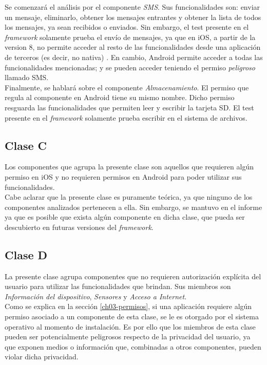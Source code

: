 Se comenzará el análisis por el componente \emph{SMS}. Sus funcionalidades son: enviar un mensaje, eliminarlo, obtener los mensajes entrantes y obtener la lista de todos los mensajes, ya sean recibidos o enviados. Sin embargo, el test presente en el \textit{framework} solamente prueba el envío de mensajes, ya que en iOS, a partir de la version 8, no permite acceder al resto de las funcionalidades desde una aplicación de terceros (es decir, no nativa) \cite{foda, foda2}. En cambio, Android permite acceder a todas las funcionalidades mencionadas; y se pueden acceder teniendo el permiso \textit{peligroso} llamado SMS.\\

Finalmente, se hablará sobre el componente \emph{Almacenamiento}. El permiso que regula al componente en Android tiene su mismo nombre. Dicho permiso resguarda las funcionalidades que permiten leer y escribir la tarjeta SD. El test presente en el \textit{framework} solamente prueba escribir en el sistema de archivos.
\subsection{Clase C}
Los componentes que agrupa la presente clase son aquellos que requieren algún permiso en iOS y no requieren permisos en Android para poder utilizar sus funcionalidades.\\

Cabe aclarar que la presente clase es puramente teórica, ya que ninguno de los componentes analizados pertenecen a ella. Sin embargo, se mantuvo en el informe ya que es posible que exista algún componente en dicha clase, que pueda ser descubierto en futuras versiones del \textit{framework}.
\subsection{Clase D}
La presente clase agrupa componentes que no requieren autorización explícita del usuario para utilizar las funcionalidades que brindan. Sus miembros son \emph{Información del dispositivo}, \emph{Sensores} y \emph{Acceso a Internet}.\\

Como se explica en la sección \ref{ch03-permisos}, si una aplicación requiere algún permiso asociado a un componente de esta clase, se le es otorgado por el sistema operativo al momento de instalación. Es por ello que los miembros de esta clase pueden ser potencialmente peligrosos respecto de la privacidad del usuario, ya que exponen medios o información que, combinadas a otros componentes, pueden violar dicha privacidad.\\

